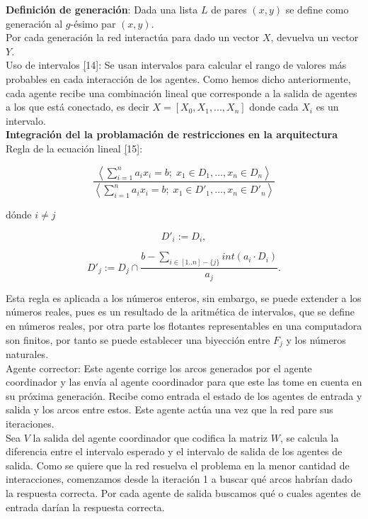         \textbf{Definición de generación}: Dada una lista $L$ de pares $(x,y)$ se define como generación al $g$-ésimo par $(x,y)$. \\
        
        Por cada generación la red interactúa para dado un vector $X$, devuelva un vector $Y$.\\
        
        Uso de intervalos \hyperref[sec:24][14]: Se usan intervalos para calcular el rango de valores más probables en cada interacción de los agentes. Como hemos dicho anteriormente, cada agente recibe una combinación lineal
        que corresponde a la salida de agentes a los que está conectado, es decir $X=[X_0,X_1,...,X_n]$ donde cada $X_i$ es un intervalo. \\
        
        
        \textbf{Integración del la problamación de restricciones en la arquitectura} \\
        
        Regla de la ecuación lineal \hyperref[sec:25][15]:

                $$\frac{\left\langle \sum_{i=1}^{n} a_i x_i = b ; \; x_1 \in D_1, \ldots, x_n \in D_n \right\rangle}
                {\left\langle \sum_{i=1}^{n} a_i x_i = b ; \; x_1 \in D'_1, \ldots, x_n \in D'_n \right\rangle}$$

            dónde $i \neq j$

            \[ D'_i := D_i, \]

            \[ D'_j := D_j \cap \frac{b - \sum_{i \in [1..n] - \{j\}} int(a_i \cdot D_i)}{a_j}. \]

            Esta regla es aplicada a los números enteros, sin embargo, se puede extender a los números reales, pues es un resultado de la aritmética de intervalos, que se define en números reales, por 
            otra parte los flotantes representables en una computadora son finitos, por tanto se puede establecer una biyección entre $F_j$ y los números naturales.\\

        Agente corrector: Este agente corrige los arcos generados por el agente coordinador y las envía al agente coordinador para que este las tome en cuenta en su próxima generación. Recibe como entrada el estado de los agentes de entrada y salida y los arcos entre estos. Este agente actúa una vez que la red pare sus iteraciones. \\

        Sea $V$ la salida del agente coordinador que codifica la matriz $W$, se calcula la diferencia entre el intervalo esperado y el intervalo de salida de los agentes de salida.
        Como se quiere que la red resuelva el problema en la menor cantidad de interacciones, comenzamos desde la iteración 1 a buscar qué arcos habrían dado la
        respuesta correcta. Por cada agente de salida buscamos qué o cuales agentes de entrada darían la respuesta correcta.  \\

